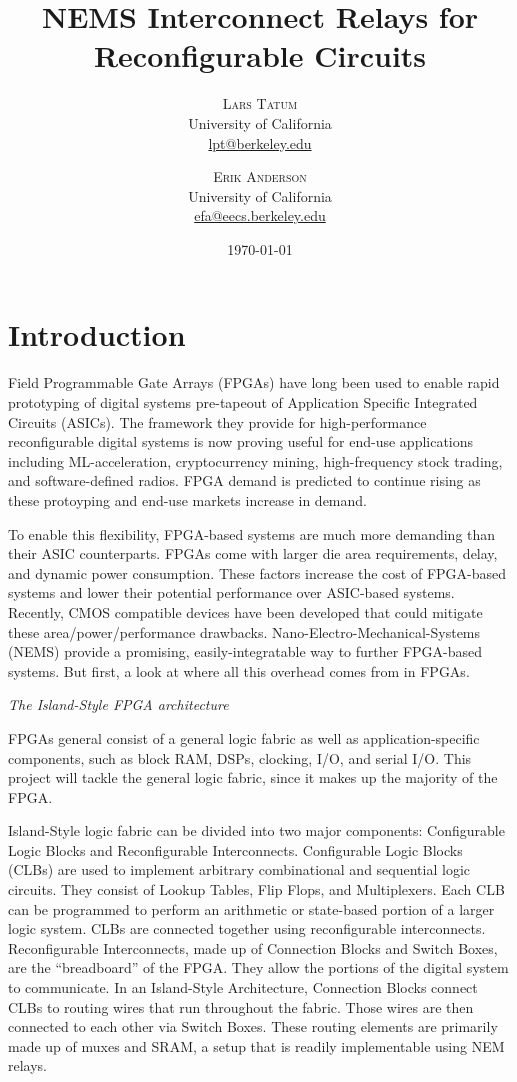 \documentclass[twoside,twocolumn]{article}
\title{NEMS Interconnect Relays for Reconfigurable Circuits} %
\author{%
\textsc{Lars Tatum}\\[1ex] %
\normalsize University of California \\ %
\normalsize \href{mailto:lpt@berkeley.edu}{lpt@berkeley.edu} %
\and %
\textsc{Erik Anderson}\\[1ex] %
\normalsize University of California \\ %
\normalsize \href{mailto:efa@eecs.berkeley.edu}{efa@eecs.berkeley.edu} %
}
\date{\today} %
\begin{document}
\maketitle


\section{Introduction}
Field Programmable Gate Arrays (FPGAs) have long been used to enable rapid prototyping of digital systems pre-tapeout of Application Specific Integrated Circuits (ASICs). The framework they provide for high-performance reconfigurable digital systems is now proving useful for end-use applications including ML-acceleration, cryptocurrency mining, high-frequency stock trading, and software-defined radios. FPGA demand is predicted to continue rising as these protoyping and end-use markets increase in demand.

To enable this flexibility, FPGA-based systems are much more demanding than their ASIC counterparts. FPGAs come with larger die area requirements, delay, and dynamic power consumption. These factors increase the cost of FPGA-based systems and lower their potential performance over ASIC-based systems. Recently, CMOS compatible devices have been developed that could mitigate these area/power/performance drawbacks.  Nano-Electro-Mechanical-Systems (NEMS) provide a promising, easily-integratable way to further FPGA-based systems. But first, a look at where all this overhead comes from in FPGAs.

\textit{The Island-Style FPGA architecture}

FPGAs general consist of a general logic fabric as well as application-specific components, such as block RAM, DSPs, clocking, I/O, and serial I/O. This project will tackle the general logic fabric, since it makes up the majority of the FPGA.

Island-Style logic fabric can be divided into two major components: Configurable Logic Blocks and Reconfigurable Interconnects. Configurable Logic Blocks (CLBs) are used to implement arbitrary combinational and sequential logic circuits. They consist of Lookup Tables, Flip Flops, and Multiplexers. Each CLB can be programmed to perform an arithmetic or state-based portion of a larger logic system. CLBs are connected together using reconfigurable interconnects. Reconfigurable Interconnects, made up of Connection Blocks and Switch Boxes, are the “breadboard” of the FPGA. They allow the portions of the digital system to communicate. In an Island-Style Architecture, Connection Blocks connect CLBs to routing wires that run throughout the fabric. Those wires are then connected to each other via Switch Boxes. These routing elements are primarily made up of muxes and SRAM, a setup that is readily implementable using NEM relays.
\end{document}
